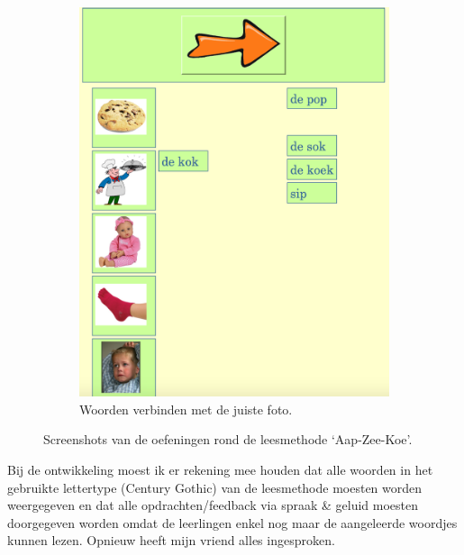 \documentclass[a4paper,11pt]{article}
\theoremstyle{definition}
\begin{document}
\begin{figure}[h!]
\begin{subfigure}{.5\textwidth}
                \includegraphics[scale=0.15]{aap2.jpg}
                \caption{Woorden verbinden met de juiste foto.}
                \label{aap2}
        \end{subfigure}
           \caption{Screenshots van de oefeningen rond de leesmethode `Aap-Zee-Koe'.}
\end{figure}
 \noindent Bij de ontwikkeling moest ik er rekening mee houden dat alle woorden in het gebruikte lettertype (Century Gothic) van de 
 leesmethode moesten worden weergegeven en dat alle opdrachten/feedback via spraak 
 \& geluid moesten doorgegeven worden omdat de leerlingen enkel nog maar de 
 aangeleerde woordjes kunnen lezen. Opnieuw heeft mijn vriend alles ingesproken. 
 \\
 
\end{document}
